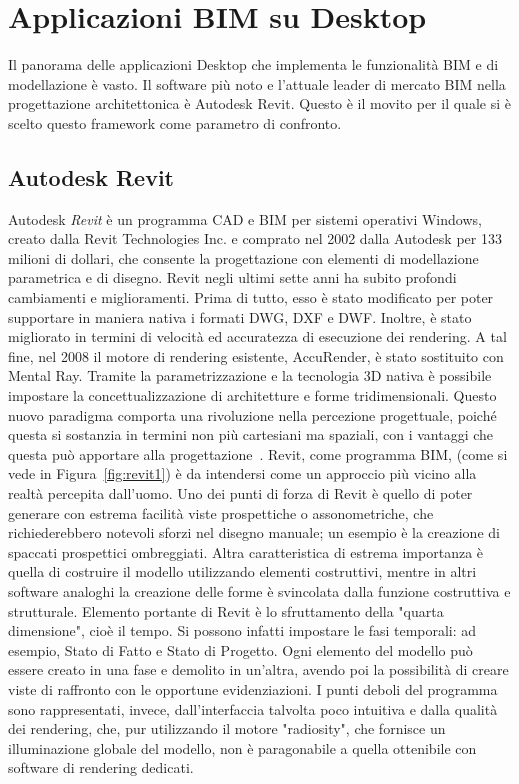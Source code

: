 \section{Applicazioni BIM su Desktop}
\label{sec:chapter_1_section_2}
Il panorama delle applicazioni Desktop che implementa le funzionalità BIM e di modellazione è vasto.
Il software più noto e l’attuale leader di mercato BIM nella
progettazione architettonica è Autodesk Revit. Questo è il movito per il quale si è scelto questo framework come parametro di confronto.

\subsection*{Autodesk Revit}
\label{sec:chapter_1_section_2_sub_1}
Autodesk \emph{Revit} è un programma CAD e BIM per sistemi operativi Windows, creato dalla Revit Technologies Inc. e comprato
nel 2002 dalla Autodesk per 133 milioni di dollari, che consente la progettazione con elementi di modellazione parametrica
e di disegno.
Revit negli ultimi sette anni ha subito profondi cambiamenti e miglioramenti. Prima di tutto, esso è stato modificato per poter
supportare in maniera nativa i formati DWG, DXF e DWF. Inoltre, è stato migliorato in termini di velocità ed accuratezza di
esecuzione dei rendering. A tal fine, nel 2008 il motore di rendering esistente, AccuRender, è stato sostituito con Mental Ray.
Tramite la parametrizzazione e la tecnologia 3D nativa è possibile impostare la concettualizzazione di architetture e forme
tridimensionali. Questo nuovo paradigma comporta una rivoluzione nella percezione progettuale, poiché questa si sostanzia in
termini non più cartesiani ma spaziali, con i vantaggi che questa può apportare alla progettazione~\cite{BIMrevolution}.
Revit, come programma BIM, (come si vede in Figura~\ref{fig:revit1}) è da intendersi come un approccio più vicino alla realtà
percepita dall'uomo.
Uno dei punti di forza di Revit è quello di poter generare con estrema facilità viste prospettiche o assonometriche, che
richiederebbero notevoli sforzi nel disegno manuale; un esempio è la creazione di spaccati prospettici ombreggiati.
Altra caratteristica di estrema importanza è quella di costruire il modello utilizzando elementi costruttivi, mentre
in altri software analoghi la creazione delle forme è svincolata dalla funzione costruttiva e strutturale.
Elemento portante di Revit è lo sfruttamento della "quarta dimensione", cioè il tempo. Si possono infatti impostare le fasi
temporali: ad esempio, Stato di Fatto e Stato di Progetto. Ogni elemento del modello può essere creato in una fase e demolito
in un'altra, avendo poi la possibilità di creare viste di raffronto con le opportune evidenziazioni.
I punti deboli del programma sono rappresentati, invece, dall'interfaccia talvolta poco intuitiva e dalla qualità dei rendering,
che, pur utilizzando il motore "radiosity", che fornisce un illuminazione globale del modello, non è paragonabile
a quella ottenibile con software di rendering dedicati.\\

